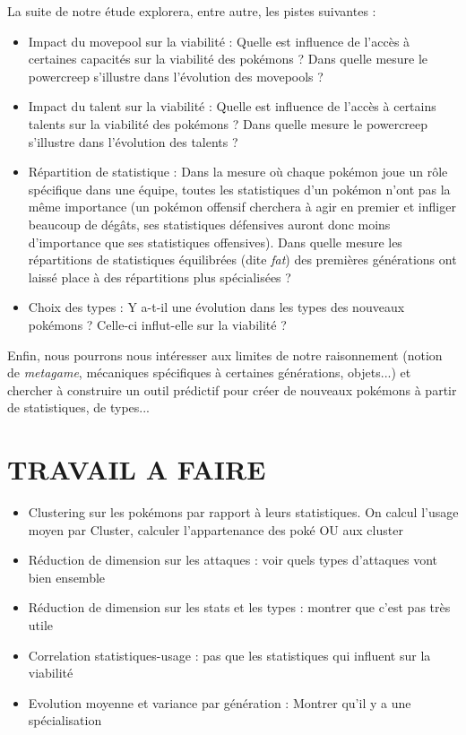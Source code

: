 \documentclass[a4paper,12pt]{article}
\begin{document}
La suite de notre étude explorera, entre autre, les pistes suivantes :
\begin{itemize}
    \item Impact du movepool sur la viabilité : Quelle est influence de l'accès
    à certaines capacités sur la viabilité des pokémons ? Dans quelle mesure le
    powercreep s'illustre dans l'évolution des movepools ?
    \item Impact du talent sur la viabilité : Quelle est influence de l'accès à
    certains talents sur la viabilité des pokémons ? Dans quelle mesure le
    powercreep s'illustre dans l'évolution des talents ?
    \item Répartition de statistique : Dans la mesure où chaque pokémon joue un
    rôle spécifique dans une équipe, toutes les statistiques d'un pokémon n'ont
    pas la même importance (un pokémon offensif cherchera à agir en premier et
    infliger beaucoup de dégâts, ses statistiques défensives auront donc moins
    d'importance que ses statistiques offensives). Dans quelle mesure les
    répartitions de statistiques équilibrées (dite \textit{fat}) des premières
    générations ont laissé place à des répartitions plus spécialisées ?
    \item Choix des types : Y a-t-il une évolution dans les types des nouveaux
    pokémons ? Celle-ci influt-elle sur la viabilité ?
\end{itemize}

Enfin, nous pourrons nous intéresser aux limites de notre raisonnement (notion
de \textit{metagame}, mécaniques spécifiques à certaines générations, objets...)
et chercher à construire un outil prédictif pour créer de nouveaux pokémons à
partir de statistiques, de types...


\section{TRAVAIL A FAIRE}

\begin{itemize}
    \item Clustering sur les pokémons par rapport à leurs statistiques. On
    calcul l'usage moyen par Cluster, calculer l'appartenance des poké OU aux
    cluster
    \item Réduction de dimension sur les attaques : voir quels types d'attaques
    vont bien ensemble
    \item Réduction de dimension sur les stats et les types : montrer que c'est
    pas très utile
    \item Correlation statistiques-usage : pas que les statistiques qui influent
    sur la viabilité
    \item Evolution moyenne et variance par génération : Montrer qu'il y a une
    spécialisation
\end{itemize}
\end{document}
